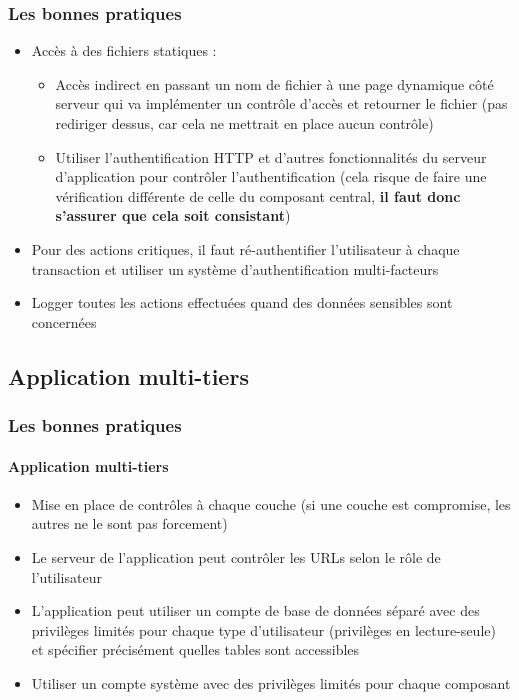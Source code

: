 \documentclass[aspectratio=169]{beamer}  %
\begin{document}
\begin{frame}
  \frametitle{Les bonnes pratiques}
  \begin{exampleblock}{}
    \begin{itemize}
      \item Accès à des fichiers statiques : 
      \begin{itemize}
        \item Accès indirect en passant un nom de fichier à une page dynamique côté serveur qui va implémenter un contrôle d'accès et retourner le fichier (pas rediriger dessus, car cela ne mettrait en place aucun contrôle)
        \item Utiliser l'authentification HTTP et d'autres fonctionnalités du serveur d'application pour contrôler l'authentification (cela risque de faire une vérification différente de celle du composant central, \textbf{il faut donc s'assurer que cela soit consistant})
      \end{itemize}
    \end{itemize}
  \end{exampleblock}
  \pause
  \begin{alertblock}{}
    \begin{itemize}
      \item Pour des actions critiques, il faut ré-authentifier l'utilisateur à chaque transaction et utiliser un système d'authentification multi-facteurs
    \end{itemize}
  \end{alertblock}
  \pause
  \begin{exampleblock}{}
    \begin{itemize}
      \item Logger toutes les actions effectuées quand des données sensibles sont concernées
    \end{itemize}
  \end{exampleblock}
\end{frame}

\subsection{Application multi-tiers}
\begin{frame}
  \frametitle{Les bonnes pratiques}
  \framesubtitle{Application multi-tiers}
  \begin{exampleblock}{}
    \begin{itemize}
      \item Mise en place de contrôles à chaque couche (si une couche est compromise, les autres ne le sont pas forcement)
      \item Le serveur de l'application peut contrôler les URLs selon le rôle de l'utilisateur
      \item L'application peut utiliser un compte de base de données séparé avec des privilèges limités pour chaque type d'utilisateur (privilèges en lecture-seule) et spécifier précisément quelles tables sont accessibles
      \item Utiliser un compte système avec des privilèges limités pour chaque composant
    \end{itemize}
  \end{exampleblock}
\end{frame}
\end{document}
